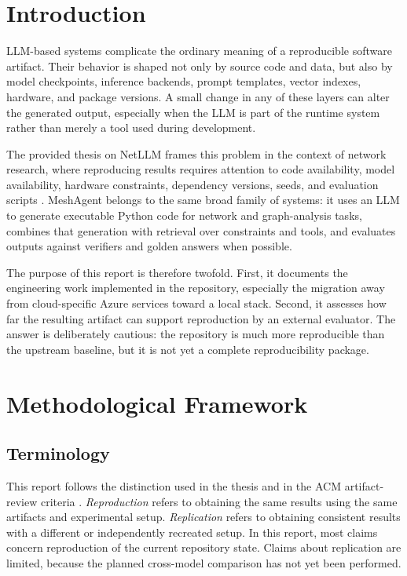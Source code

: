 \documentclass[11pt,a4paper]{article}
\newcommand{\repo}{MeshAgent}
\begin{document}
\section{Introduction}

LLM-based systems complicate the ordinary meaning of a reproducible software artifact. Their behavior is shaped not only by source code and data, but also by model checkpoints, inference backends, prompt templates, vector indexes, hardware, and package versions. A small change in any of these layers can alter the generated output, especially when the LLM is part of the runtime system rather than merely a tool used during development.

The provided thesis on NetLLM frames this problem in the context of network research, where reproducing results requires attention to code availability, model availability, hardware constraints, dependency versions, seeds, and evaluation scripts \cite{rissanen2026netllm,wu2024netllm}. \repo{} belongs to the same broad family of systems: it uses an LLM to generate executable Python code for network and graph-analysis tasks, combines that generation with retrieval over constraints and tools, and evaluates outputs against verifiers and golden answers when possible.

The purpose of this report is therefore twofold. First, it documents the engineering work implemented in the repository, especially the migration away from cloud-specific Azure services toward a local stack. Second, it assesses how far the resulting artifact can support reproduction by an external evaluator. The answer is deliberately cautious: the repository is much more reproducible than the upstream baseline, but it is not yet a complete reproducibility package.

\section{Methodological Framework}

\subsection{Terminology}

This report follows the distinction used in the thesis and in the ACM artifact-review criteria \cite{rissanen2026netllm,acm2020badging}. \emph{Reproduction} refers to obtaining the same results using the same artifacts and experimental setup. \emph{Replication} refers to obtaining consistent results with a different or independently recreated setup. In this report, most claims concern reproduction of the current repository state. Claims about replication are limited, because the planned cross-model comparison has not yet been performed.
\end{document}
